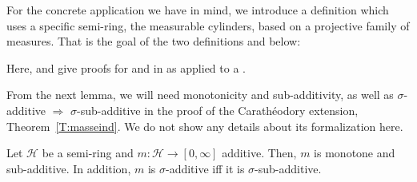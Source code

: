 \documentclass[lean]{AFM}
\begin{document}

For the concrete application we have in mind, we introduce a
definition which uses a specific semi-ring, the measurable cylinders,
based on a projective family of measures.  That is the goal of the two
definitions  and
 below:



Here,  and
  give proofs for
 and  in
 as applied to a
.

\noindent
From the next lemma, we will need monotonicity and sub-additivity, as
well as $\sigma$-additive $\Rightarrow$ $\sigma$-sub-additive in the
proof of the Carathéodory extension,
Theorem~\ref{T:masseind}. We do not show any details
  about its formalization here.

\begin{lemma}\label{l:halbextRing}
  Let $\mathcal H$ be a semi-ring and $m: \mathcal H\to [0,\infty]$
  additive. Then, $m$ is monotone and sub-additive. In addition, $m$
  is $\sigma$-additive iff it is $\sigma$-sub-additive.
\end{lemma}
\end{document}
